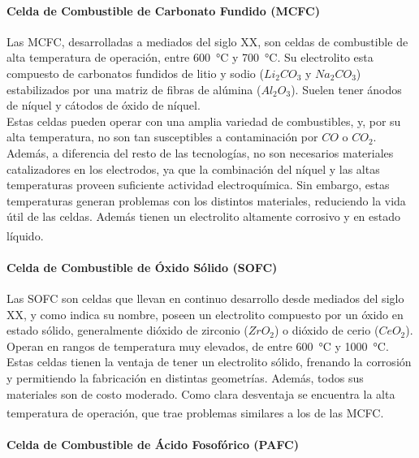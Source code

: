 \paragraph{Celda de Combustible de Carbonato Fundido (MCFC)}

Las MCFC, desarrolladas a mediados del siglo XX, son celdas de combustible de alta temperatura de operación, entre \SI{600}{\celsius} y \SI{700}{\celsius}. Su electrolito esta compuesto de carbonatos fundidos de litio y sodio ($Li_2CO_3$ y $Na_2CO_3$) estabilizados por una matriz de fibras de alúmina ($Al_2O_3$). Suelen tener ánodos de níquel y cátodos de óxido de níquel.\\

Estas celdas pueden operar con una amplia variedad de combustibles, y, por su alta temperatura, no son tan susceptibles a contaminación por $CO$ o $CO_2$. Además, a diferencia del resto de las tecnologías, no son necesarios materiales catalizadores en los electrodos, ya que la combinación del níquel y las altas temperaturas proveen suficiente actividad electroquímica. Sin embargo, estas temperaturas generan problemas con los distintos materiales, reduciendo la vida útil de las celdas. Además tienen un electrolito altamente corrosivo y en estado líquido.\textsuperscript{\cite{FC-FundAndAppl}\cite{FCHandbook}}\\

\paragraph{Celda de Combustible de Óxido Sólido (SOFC)}

Las SOFC son celdas que llevan en continuo desarrollo desde mediados del siglo XX, y como indica su nombre, poseen un electrolito compuesto por un óxido en estado sólido, generalmente dióxido de zirconio ($ZrO_2$) o dióxido de cerio ($CeO_2$). Operan en rangos de temperatura muy elevados, de entre \SI{600}{\celsius} y \SI{1000}{\celsius}.\\

Estas celdas tienen la ventaja de tener un electrolito sólido, frenando la corrosión y permitiendo la fabricación en distintas geometrías. Además, todos sus materiales son de costo moderado. Como clara desventaja se encuentra la alta temperatura de operación, que trae problemas similares a los de las MCFC.\textsuperscript{\cite{FC-FundAndAppl}\cite{FCHandbook}}\\

\paragraph{Celda de Combustible de Ácido Fosofórico (PAFC)}

